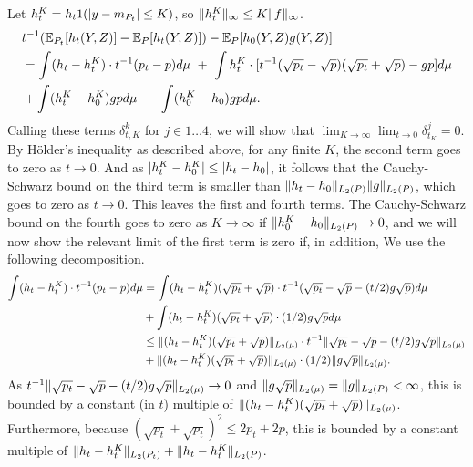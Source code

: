 Let $h_t^K = h_t 1(\lvert y - m_{P_t}\rvert  \le K)$, so $\lVert h_t^K\rVert_{\infty} \le K\lVert f\rVert_{\infty}$.  
\begin{equation}
\label{eq:bounded-score-argument-trunc}
\begin{aligned} 
&t^{-1}(\E_{P_{t}}[h_{t}(Y,Z)] - \E_{P}[h_{t}(Y,Z)]) - \E_{P}[h_0(Y,Z)g(Y,Z)] \\
&= \int (h_t - h_t^K) \cdot t^{-1}(p_t - p) d\mu\ +\  \int h_t^K \cdot [t^{-1}(\sqrt{p_t} - \sqrt{p})(\sqrt{p_t} + \sqrt{p}) - gp]d\mu \\
&+ \int (h_t^K-h_0^K) g p d\mu \ +\  \int (h_0^K - h_0) g p d\mu.
\end{aligned}
\end{equation}
Calling these terms $\delta^k_{t,K}$ for $j \in 1\ldots 4$,
we will show that $\lim_{K \to \infty}\lim_{t \to 0}\delta^j_{t_K}=0$.
By H\"older's inequality as described above, for any finite $K$, the second term goes to zero as $t \to 0$.
And as $\lvert h_t^K - h_0^K\rvert \le \lvert h_t - h_0\rvert$, it follows that the Cauchy-Schwarz bound on the third term
is smaller than $\norm{h_t - h_0}_{L_2(\P)}\norm{g}_{L_2(\P)}$, which goes to zero as $t \to 0$. 
This leaves the first and fourth terms. The Cauchy-Schwarz bound on the fourth goes to zero as $K \to \infty$ if $\norm{h_0^K - h_0}_{L_2(\P)} \to 0$,
and we will now show the relevant limit of the first term is zero if, in addition, 
We use the following decomposition.
\begin{align*}
\int (h_t-h_t^K) \cdot t^{-1}(p_t - p) d\mu 
&= \int (h_t-h_t^K)(\sqrt{p_t} + \sqrt{p}) \cdot t^{-1}(\sqrt{p_t} - \sqrt{p} - (t/2)g\sqrt{p}) d\mu \\
&+ \int (h_t-h_t^K)(\sqrt{p_t} + \sqrt{p}) \cdot (1/2)g\sqrt{p} d\mu \\
&\le \lVert(h_t-h_t^K)(\sqrt{p_t} + \sqrt{p})\rVert_{L_2(\mu)} \cdot t^{-1}\lVert\sqrt{p_t} - \sqrt{p} - (t/2)g\sqrt{p}\rVert_{L_2(\mu)} \\
& +  \lVert(h_t-h_t^K)(\sqrt{p_t} + \sqrt{p})\rVert_{L_2(\mu)} \cdot (1/2)\lVert g\sqrt{p}\rVert_{L_2(\mu)}. 
\end{align*}
As $t^{-1}\lVert\sqrt{p_t} - \sqrt{p} - (t/2)g\sqrt{p}\rVert_{L_2(\mu)} \to 0$ and $\norm{g\sqrt{p}}_{L_2(\mu)} = \norm{g}_{L_2(\P)} < \infty$,
this is bounded by a constant (in $t$) multiple of $\lVert(h_t-h_t^K)(\sqrt{p_t} + \sqrt{p})\rVert_{L_2(\mu)}$. Furthermore, 
because $(\sqrt{p_t} + \sqrt{p_t})^2 \le 2p_t + 2p$, this is bounded by a constant multiple of $\norm{h_t-h_t^K}_{L_2(\P_t)} + \norm{h_t - h_t^K}_{L_2(\P)}$.
